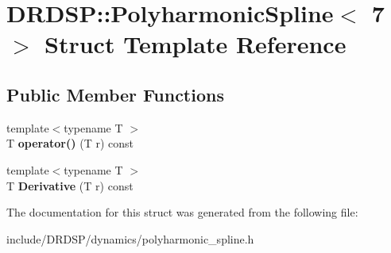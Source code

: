 \hypertarget{struct_d_r_d_s_p_1_1_polyharmonic_spline_3_017_01_4}{\section{D\-R\-D\-S\-P\-:\-:Polyharmonic\-Spline$<$ 7 $>$ Struct Template Reference}
\label{struct_d_r_d_s_p_1_1_polyharmonic_spline_3_017_01_4}
}
\subsection*{Public Member Functions}
\begin{DoxyCompactItemize}
\item 
\hypertarget{struct_d_r_d_s_p_1_1_polyharmonic_spline_3_017_01_4_a7c3e3d056498269d5c3ba22311091e7b}{{\footnotesize template$<$typename T $>$ }\\T {\bfseries operator()} (T r) const }\label{struct_d_r_d_s_p_1_1_polyharmonic_spline_3_017_01_4_a7c3e3d056498269d5c3ba22311091e7b}

\item 
\hypertarget{struct_d_r_d_s_p_1_1_polyharmonic_spline_3_017_01_4_af4723f77839c9789889edfbdfb1768d4}{{\footnotesize template$<$typename T $>$ }\\T {\bfseries Derivative} (T r) const }\label{struct_d_r_d_s_p_1_1_polyharmonic_spline_3_017_01_4_af4723f77839c9789889edfbdfb1768d4}

\end{DoxyCompactItemize}


The documentation for this struct was generated from the following file\-:\begin{DoxyCompactItemize}
\item 
include/\-D\-R\-D\-S\-P/dynamics/polyharmonic\-\_\-spline.\-h\end{DoxyCompactItemize}
